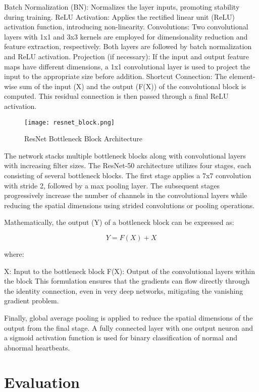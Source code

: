 \documentclass[conference]{IEEEtran}
\begin{document}
Batch Normalization (BN): Normalizes the layer inputs, promoting stability during training.
ReLU Activation: Applies the rectified linear unit (ReLU) activation function, introducing non-linearity.
Convolutions: Two convolutional layers with 1x1 and 3x3 kernels are employed for dimensionality reduction and feature extraction, respectively. Both layers are followed by batch normalization and ReLU activation.
Projection (if necessary): If the input and output feature maps have different dimensions, a 1x1 convolutional layer is used to project the input to the appropriate size before addition.
Shortcut Connection: The element-wise sum of the input (X) and the output (F(X)) of the convolutional block is computed. This residual connection is then passed through a final ReLU activation.
\begin{figure}[h!]
\centering
\texttt{[image: resnet\_block.png]}

\caption{ResNet Bottleneck Block Architecture}
\label{fig:resnet_block}
\end{figure}

The network stacks multiple bottleneck blocks along with convolutional layers with increasing filter sizes. The ResNet-50 architecture utilizes four stages, each consisting of several bottleneck blocks. The first stage applies a 7x7 convolution with stride 2, followed by a max pooling layer. The subsequent stages progressively increase the number of channels in the convolutional layers while reducing the spatial dimensions using strided convolutions or pooling operations.

Mathematically, the output (Y) of a bottleneck block can be expressed as:

\begin{equation}
Y = F(X) + X
\label{eq:resnet_output}
\end{equation}

where:

X: Input to the bottleneck block
F(X): Output of the convolutional layers within the block
This formulation ensures that the gradients can flow directly through the identity connection, even in very deep networks, mitigating the vanishing gradient problem.

Finally, global average pooling is applied to reduce the spatial dimensions of the output from the final stage. A fully connected layer with one output neuron and a sigmoid activation function is used for binary classification of normal and abnormal heartbeats.

\section{Evaluation}
\end{document}
